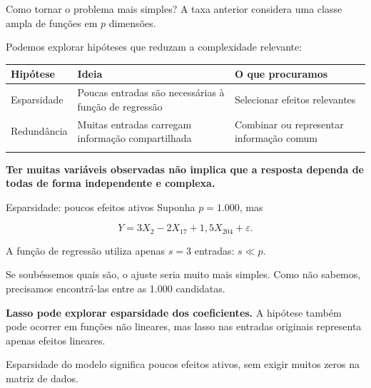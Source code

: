 \documentclass[
  10pt,
  ignorenonframetext,
  aspectratio=169,
  brazilian,
]{beamer}
\newcounter{none} %
\begin{document}
\begin{frame}{Como tornar o problema mais simples?}
\protect{}\label{como-tornar-o-problema-mais-simples}
A taxa anterior considera uma classe ampla de funções em \(p\)
dimensões.

Podemos explorar hipóteses que reduzam a complexidade relevante:

{\def\LTcaptype{none} %
\begin{longtable}[]{@{}
  >{\raggedright\arraybackslash}p{}
  >{\raggedright\arraybackslash}p{}
  >{\raggedright\arraybackslash}p{}@{}}
\toprule\noalign{}
\begin{minipage}[b]{\linewidth}\raggedright
Hipótese
\end{minipage} & \begin{minipage}[b]{\linewidth}\raggedright
Ideia
\end{minipage} & \begin{minipage}[b]{\linewidth}\raggedright
O que procuramos
\end{minipage} \\
\midrule\noalign{}
\endhead
Esparsidade & Poucas entradas são necessárias à função de regressão &
Selecionar efeitos relevantes \\
Redundância & Muitas entradas carregam informação compartilhada &
Combinar ou representar informação comum \\
\bottomrule\noalign{}
\end{longtable}
}

\textbf{Ter muitas variáveis observadas não implica que a resposta
dependa de todas de forma independente e complexa.}
\end{frame}

\begin{frame}{Esparsidade: poucos efeitos ativos}
\protect{}\label{esparsidade-poucos-efeitos-ativos}
Suponha \(p=1.000\), mas

\[
Y=3X_2-2X_{17}+1{,}5X_{204}+\varepsilon.
\]

A função de regressão utiliza apenas \(s=3\) entradas: \(s\ll p\).

Se soubéssemos quais são, o ajuste seria muito mais simples. Como não
sabemos, precisamos encontrá-las entre as 1.000 candidatas.

\textbf{Lasso pode explorar esparsidade dos coeficientes.} A hipótese
também pode ocorrer em funções não lineares, mas lasso nas entradas
originais representa apenas efeitos lineares.

Esparsidade do modelo significa poucos efeitos ativos, sem exigir muitos
zeros na matriz de dados.
\end{frame}
\end{document}
